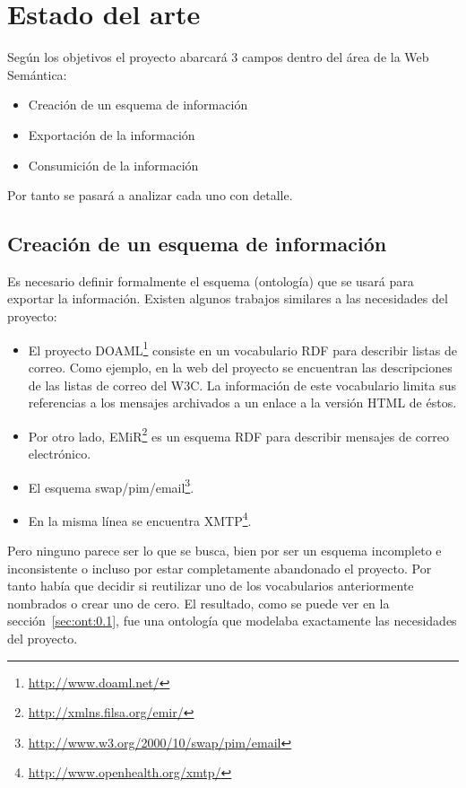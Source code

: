 
\section{Estado del arte}

Según los objetivos el proyecto abarcará 3 campos dentro del área de la
Web Semántica:

\begin{itemize}
 \item Creación de un esquema de información
 \item Exportación de la información
 \item Consumición de la información
\end{itemize}

Por tanto se pasará a analizar cada uno con detalle.

\subsection{Creación de un esquema de información}

Es necesario definir formalmente el esquema (ontología) que se usará para
exportar la información. Existen algunos trabajos similares a las necesidades 
del proyecto:

\begin{itemize}
  \item El proyecto DOAML\footnote{\url{http://www.doaml.net/}} consiste en un 
	vocabulario RDF para describir listas de correo. Como ejemplo, en 
	la web del proyecto se encuentran las descripciones de las listas 
	de correo del W3C. La información de este vocabulario limita sus 
	referencias a los mensajes archivados a un enlace a la versión HTML 
	de éstos.
  \item Por otro lado, EMiR\footnote{\url{http://xmlns.filsa.org/emir/}} es un 
	esquema RDF para describir mensajes de correo electrónico. 
  \item El esquema swap/pim/email\footnote{\url{http://www.w3.org/2000/10/swap/pim/email}}.
  \item En la misma línea se encuentra XMTP\footnote{\url{http://www.openhealth.org/xmtp/}}.
\end{itemize}

Pero ninguno parece ser lo que se busca, bien por ser un esquema incompleto e
inconsistente o incluso por estar completamente abandonado el proyecto. Por 
tanto había que decidir si reutilizar uno de los vocabularios anteriormente
nombrados o crear uno de cero. El resultado, como se puede ver en la
sección~\ref{sec:ont:0.1}, fue una ontología que modelaba exactamente las
necesidades del proyecto.

